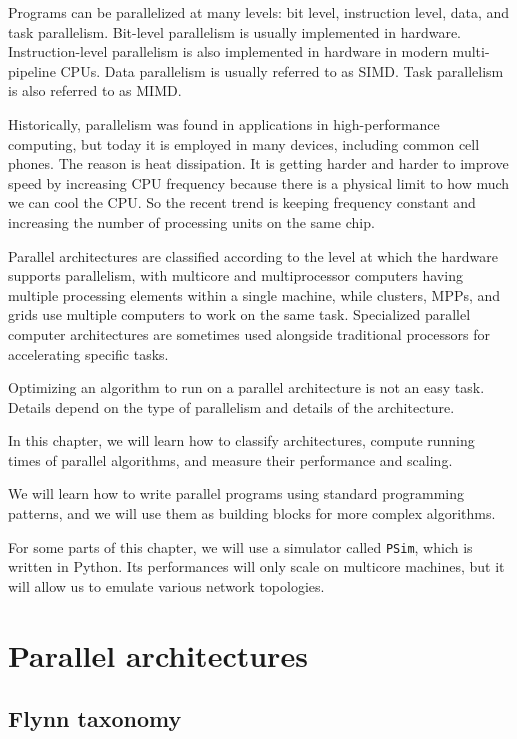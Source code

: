 \documentclass[justified,sixbynine]{tufte-book}
\def\ft{\small\tt}
\theoremstyle{plain}%
\theoremstyle{definition}
\theoremstyle{remark}
\begin{document}
\begin{fullwidth}
Programs can be parallelized at many levels: bit level, instruction level, data, and task parallelism. Bit-level parallelism is usually implemented in hardware. Instruction-level parallelism is also implemented in hardware in modern multi-pipeline CPUs.  Data parallelism is usually referred to as SIMD. Task parallelism is also referred to as MIMD.

Historically, parallelism was found in applications in high-performance computing, but today it is employed in many devices, including common cell phones. The reason is heat dissipation. It is getting harder and harder to improve speed by increasing CPU frequency because there is a physical limit to how much we can cool the CPU. So the recent trend is keeping frequency constant and increasing the number of processing units on the same chip.

Parallel architectures are classified according to the level at which the hardware supports parallelism, with multicore and multiprocessor computers having multiple processing elements within a single machine, while clusters, MPPs, and grids use multiple computers to work on the same task. Specialized parallel computer architectures are sometimes used alongside traditional processors for accelerating specific tasks.

Optimizing an algorithm to run on a parallel architecture is not an easy task. Details depend on the type of parallelism and details of the architecture.

In this chapter, we will learn how to classify architectures, compute running times of parallel algorithms, and measure their performance and scaling.

We will learn how to write parallel programs using standard programming patterns, and we will use them as building blocks for more complex algorithms.

For some parts of this chapter, we will use a simulator called {\ft PSim}, which is written in Python. Its performances will only scale on multicore machines, but it will allow us to emulate various network topologies.

\section{Parallel architectures}

\goodbreak\subsection{Flynn taxonomy}


\end{fullwidth}
\end{document}
